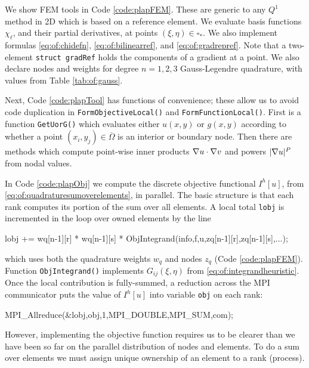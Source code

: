 We show FEM tools in Code \ref{code:plapFEM}.  These are generic to any $Q^1$ method in 2D which is based on a reference element.  We evaluate basis functions $\chi_\ell$, and their partial derivatives, at points $(\xi,\eta) \in \square_\ast$.  We also implement formulas \eqref{eq:of:chidefn}, \eqref{eq:of:bilinearref}, and \eqref{eq:of:gradrepref}.  Note that a two-element \texttt{struct gradRef} holds the components of a gradient at a point.  We also declare nodes and weights for degree $n=1,2,3$ Gauss-Legendre quadrature, with values from Table \ref{tab:of:gauss}.


Next, Code \ref{code:plapTool} has functions of convenience; these allow us to avoid code duplication in \texttt{FormObjectiveLocal()} and \texttt{FormFunctionLocal()}.  First is a function \texttt{GetUorG()} which evaluates either $u(x,y)$ or $g(x,y)$ according to whether a point $(x_i,y_j)\in\overline\Omega$ is an interior or boundary node.  Then there are methods which compute point-wise inner products $\nabla u\cdot \nabla v$ and powers $|\nabla u|^P$ from nodal values.


In Code \ref{code:plapObj} we compute the discrete objective functional $I^h[u]$, from \eqref{eq:of:quadraturesumoverelements}, in parallel.  The basic structure is that each rank computes its portion of the sum over all elements.  A local total \texttt{lobj} is incremented in the loop over owned elements by the line
\begin{code}
    lobj += wq[n-1][r] * wq[n-1][s] * ObjIntegrand(info,f,u,zq[n-1][r],zq[n-1][s],...);
\end{code}
which uses both the quadrature weights $w_q$ and nodes $z_q$ (Code \ref{code:plapFEM}).  Function \texttt{ObjIntegrand()} implements $G_{ij}(\xi,\eta)$ from \eqref{eq:of:integrandheuristic}.  Once the local contribution is fully-summed, a reduction across the MPI communicator puts the value of $I^h[u]$ into variable \texttt{obj} on each rank:
\begin{code}
    MPI_Allreduce(&lobj,obj,1,MPI_DOUBLE,MPI_SUM,com);
\end{code}

However, implementing the objective function requires us to be clearer than we have been so far on the parallel distribution of nodes and elements.  To do a sum over elements we must assign unique ownership of an element to a rank (process).

